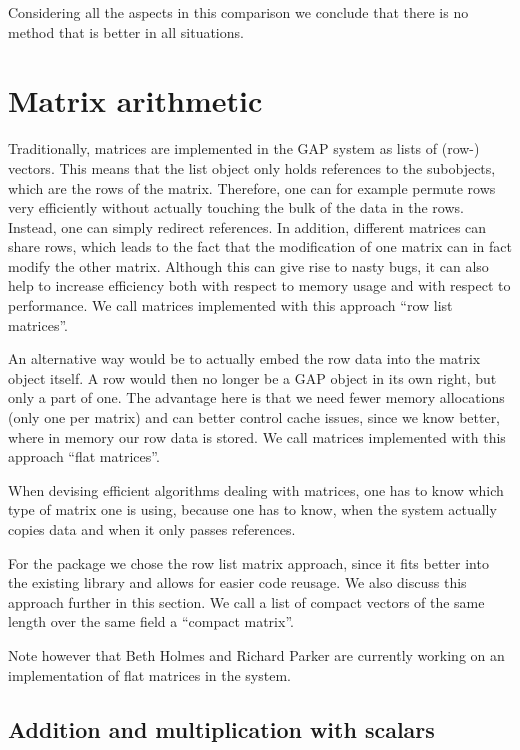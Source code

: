 Considering all the aspects in this comparison we conclude that there 
is no method that is better in all situations.


\section{Matrix arithmetic}
\label{sec:matarith}
\enlargethispage{-1\baselineskip}

Traditionally, matrices are implemented in the {\sf GAP} system as
lists of (row-) vectors. This means that the list object only
holds references to the subobjects, which are the rows of the matrix.
Therefore, one can for example permute rows very efficiently without
actually touching the bulk of the data in the rows. Instead, one can
simply redirect references. In addition, different matrices can share
rows, which leads to the fact that the modification of one matrix
can in fact modify the other matrix. Although this can give rise to
nasty bugs, it can also help to increase efficiency both with respect
to memory usage and with respect to performance. We call matrices
implemented with this approach ``row list matrices''.

An alternative way would be to actually embed the row data into the
matrix object itself. A row would then no longer be a {\sf GAP} object
in its own right, but only a part of one. The advantage here is that
we need fewer memory allocations (only one per matrix) and can better
control cache issues, since we know better, where in memory our row data
is stored. We call matrices implemented with this approach ``flat
matrices''.

When devising efficient algorithms dealing with matrices, one has to know
which type of matrix one is using, because one has to know, when the
system actually copies data and when it only passes references.

For the {\cvec} package we chose the row list matrix approach, since it fits
better into the existing {\GAP} library and allows for easier code reusage.
We also discuss this approach further in this section. We call a list
of compact vectors of the same length over the same field a ``compact
matrix''.

Note however that Beth Holmes and Richard Parker are currently working
on an implementation of flat matrices in the {\GAP} system.


\subsection{Addition and multiplication with scalars}
\label{addmulsca}

